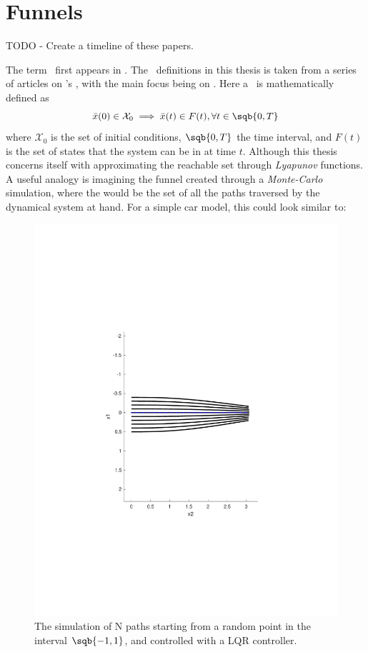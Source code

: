 \chapter{Funnels}

TODO - Create a timeline of these papers.

The term \funnel\ first appears in \cite{masonMechanicsManipulation1985}. The
\funnel\ definitions in this thesis is taken from a series of articles on
\funnel 's \cite{Tobenkin_2011} \cite{tedrakeLQRtreesFeedbackMotion2009}
\cite{majumdarRobustOnlineMotion2013} \cite{majumdarFunnelLibrariesRealtime2017}
\cite{ahmadiDSOSSDSOSOptimization2017}, with the main focus being on
\cite{majumdarFunnelLibrariesRealtime2017}. Here a \funnel\ is mathematically
defined as
\[
  \bar{x}(0) \in \mathcal{X}_0 \implies \bar{x}(t) \in F(t), \forall t \in
  \sqb{0,T}
\]
where \(\mathcal{X}_0\) is the set of initial conditions, \(\sqb{0,T}\) the time
interval, and \(F(t)\) is the set of states that the system can be in at time
\(t\). Although this thesis concerns itself with approximating the reachable set
through \textit{Lyapunov} functions. A useful analogy is imagining the funnel
created through a \textit{Monte-Carlo} simulation, where the \funnel would be
the set of all the paths traversed by the dynamical system at hand. For a simple
car model, this could look similar to:

\begin{figure}
  \includegraphics[scale=.5]{figures/funnels/montecarlofunnel}
  \caption{The simulation of N paths starting from a random point in the
    interval \(\sqb{-1,1}\), and controlled with a LQR controller.}
\end{figure}

